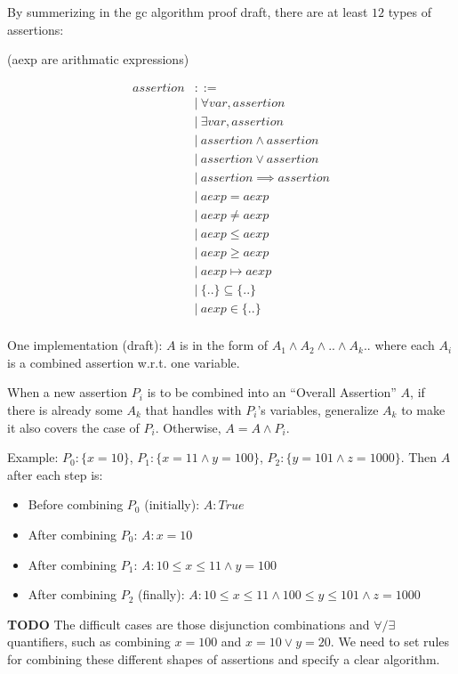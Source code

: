 \documentclass[fleqn]{article}
\begin{document}
\bigskip

By summerizing in the gc algorithm proof draft, there are at least
$12$ types of assertions:

(aexp are arithmatic expressions)

\begin{equation*}
\begin{aligned}
assertion &::=\\
&| \ \forall var, assertion\\
&| \ \exists var, assertion\\
&| \ assertion \land assertion\\
&| \ assertion \lor assertion\\
&| \ assertion \implies assertion\\
&| \ aexp = aexp\\
&| \ aexp \neq aexp\\
&| \ aexp \le aexp\\
&| \ aexp \ge aexp\\
&| \ aexp \mapsto aexp\\
&| \ \{ .. \} \subseteq \{ .. \}\\
&| \ aexp \in \{ .. \}\\
\end{aligned}
\end{equation*}

One implementation (draft): $A$ is in the form of $A_1 \land A_2 \land
.. \land A_k ..$ where each $A_i$ is a combined assertion w.r.t. one
variable.

When a new assertion $P_i$ is to be combined into an ``Overall
Assertion'' $A$, if there is already some $A_k$ that handles with
$P_i$'s variables, generalize $A_k$ to make it also covers
the case of $P_i$. Otherwise, $A = A \land P_i$.

Example: $P_0: \{ x = 10 \}$, $P_1: \{ x = 11 \land y = 100\}$, $P_2:
\{ y = 101 \land z = 1000 \}$. Then $A$ after each step is:

\begin{itemize}
\item Before combining $P_0$ (initially): $A: True$
\item After combining $P_0$: $A: x = 10$
\item After combining $P_1$: $A: 10 \le x \le 11 \land y = 100$
\item After combining $P_2$ (finally): $A: 10 \le x \le 11 \land 100 \le y \le 101 \land z = 1000 $
\end{itemize}

\textbf{TODO} The difficult cases are those disjunction combinations
and $\forall / \exists$ quantifiers, such as combining $x = 100$ and
$x = 10 \lor y = 20$. We need to set rules for combining these
different shapes of assertions and specify a clear algorithm.
\end{document}

